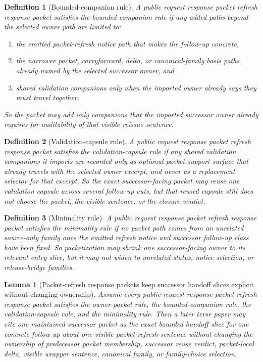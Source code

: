 \documentclass[11pt]{article}
\newtheorem{definition}{Definition}
\newtheorem{lemma}{Lemma}
\begin{document}
\begin{definition}[Bounded-companion rule]
A public request response packet refresh response packet satisfies the \emph{bounded-companion rule} if any added paths beyond the selected owner path are limited to:
\begin{enumerate}[leftmargin=*]
\item the emitted packet-refresh notice path that makes the follow-up concrete,
\item the narrower packet, carryforward, delta, or canonical-family basis paths already named by the selected successor owner, and
\item shared validation companions only when the imported owner already says they must travel together.
\end{enumerate}
So the packet may add only companions that the imported successor owner already requires for auditability of that visible reissue sentence.
\end{definition}

\begin{definition}[Validation-capsule rule]
A public request response packet refresh response packet satisfies the \emph{validation-capsule rule} if any shared validation companions it imports are recorded only as optional packet-support surface that already travels with the selected owner excerpt, and never as a replacement selector for that excerpt. So the exact successor-facing packet may reuse one validation capsule across several follow-up cuts, but that reused capsule still does not choose the packet, the visible sentence, or the closure verdict.
\end{definition}

\begin{definition}[Minimality rule]
A public request response packet refresh response packet satisfies the \emph{minimality rule} if no packet path comes from an unrelated source-only family once the emitted refresh notice and successor follow-up class have been fixed.
So packetization may shrink one successor-facing owner to its relevant entry slice, but it may not widen to unrelated status, notice-selection, or release-bridge families.
\end{definition}

\begin{lemma}[Packet-refresh response packets keep successor handoff slices explicit without changing ownership]
Assume every public request response packet refresh response packet satisfies the owner-packet rule, the bounded-companion rule, the validation-capsule rule, and the minimality rule.
Then a later terse paper may cite one maintained successor packet as the exact bounded handoff slice for one concrete follow-up about one visible packet-refresh sentence without changing the ownership of predecessor packet membership, successor reuse verdict, packet-local delta, visible wrapper sentence, canonical family, or family-choice selection.
\end{lemma}
\end{document}
